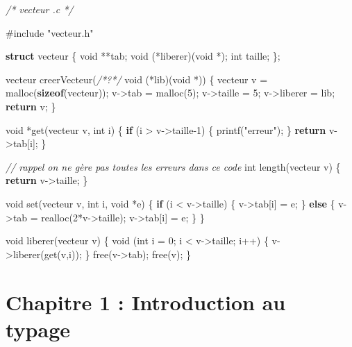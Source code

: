 \documentclass[]{article}
\newenvironment{Shaded}{}{}
\newcommand{\KeywordTok}[1]{\textcolor[rgb]{0.00,0.44,0.13}{\textbf{#1}}}
\newcommand{\DataTypeTok}[1]{\textcolor[rgb]{0.56,0.13,0.00}{#1}}
\newcommand{\DecValTok}[1]{\textcolor[rgb]{0.25,0.63,0.44}{#1}}
\newcommand{\StringTok}[1]{\textcolor[rgb]{0.25,0.44,0.63}{#1}}
\newcommand{\ImportTok}[1]{#1}
\newcommand{\CommentTok}[1]{\textcolor[rgb]{0.38,0.63,0.69}{\textit{#1}}}
\newcommand{\ControlFlowTok}[1]{\textcolor[rgb]{0.00,0.44,0.13}{\textbf{#1}}}
\newcommand{\PreprocessorTok}[1]{\textcolor[rgb]{0.74,0.48,0.00}{#1}}
\newcommand{\NormalTok}[1]{#1}
\begin{document}
\begin{Shaded}
\begin{Highlighting}[]
\CommentTok{/* vecteur .c */}

\PreprocessorTok{#include }\ImportTok{"vecteur.h"}

\KeywordTok{struct}\NormalTok{ vecteur \{}
    \DataTypeTok{void}\NormalTok{ **tab;}
    \DataTypeTok{void}\NormalTok{ (*liberer)(}\DataTypeTok{void}\NormalTok{ *);}
    \DataTypeTok{int}\NormalTok{ taille;}
\NormalTok{\};}

\NormalTok{vecteur creerVecteur(}\CommentTok{/*?*/} \DataTypeTok{void}\NormalTok{ (*lib)(}\DataTypeTok{void}\NormalTok{ *)) \{}
\NormalTok{    vecteur v = malloc(}\KeywordTok{sizeof}\NormalTok{(vecteur));}
\NormalTok{    v->tab = malloc(}\DecValTok{5}\NormalTok{);}
\NormalTok{    v->taille = }\DecValTok{5}\NormalTok{;}
\NormalTok{    v->liberer = lib;}
    \ControlFlowTok{return}\NormalTok{ v;}
\NormalTok{\}}

\DataTypeTok{void}\NormalTok{ *get(vecteur v, }\DataTypeTok{int}\NormalTok{ i) \{}
    \ControlFlowTok{if}\NormalTok{ (i > v->taille}\DecValTok{-1}\NormalTok{) \{}
\NormalTok{        printf(}\StringTok{"erreur"}\NormalTok{);}
\NormalTok{    \}}
    \ControlFlowTok{return}\NormalTok{ v->tab[i];}
\NormalTok{\}}

\CommentTok{// rappel on ne gère pas toutes les erreurs dans ce code}
\DataTypeTok{int}\NormalTok{ length(vecteur v) \{}
    \ControlFlowTok{return}\NormalTok{ v->taille;}
\NormalTok{\}}

\DataTypeTok{void}\NormalTok{ set(vecteur v, }\DataTypeTok{int}\NormalTok{ i, }\DataTypeTok{void}\NormalTok{ *e) \{}
    \ControlFlowTok{if}\NormalTok{ (i < v->taille) \{}
\NormalTok{     v->tab[i] = e;}
\NormalTok{    \}}
    \ControlFlowTok{else}\NormalTok{ \{}
\NormalTok{            v->tab = realloc(}\DecValTok{2}\NormalTok{*v->taille);}
\NormalTok{            v->tab[i] = e;}
\NormalTok{    \}}
\NormalTok{\}}

\DataTypeTok{void}\NormalTok{ liberer(vecteur v) \{}
    \DataTypeTok{void}\NormalTok{ (}\DataTypeTok{int}\NormalTok{ i = }\DecValTok{0}\NormalTok{; i < v->taille; i++) \{}
\NormalTok{        v->liberer(get(v,i));}
\NormalTok{    \}}
\NormalTok{    free(v->tab);}
\NormalTok{    free(v);}
\NormalTok{\}}
\end{Highlighting}
\end{Shaded}

\section{Chapitre 1 : Introduction au
typage}\label{chapitre-1-introduction-au-typage}
\end{document}
